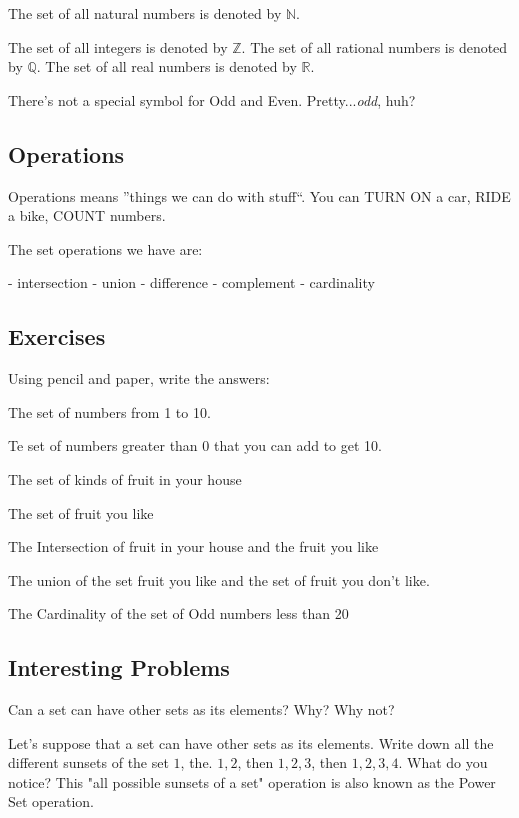 The set of all natural numbers is denoted by $\mathbb{N}$.

The set of all integers is denoted by
$\mathbb{Z}$.
The set of all rational numbers is denoted by $\mathbb{Q}$.
The set of all real numbers is denoted by $\mathbb{R}$.

There's not a special symbol for Odd and Even. Pretty...\textit{odd}, huh?

\subsection{Operations}

Operations means ''things we can do with stuff``.  You can TURN ON a car, RIDE a bike, COUNT numbers. 

The set operations we have are:

- intersection 
- union
- difference
- complement 
- cardinality 




\subsection{Exercises}

Using pencil and paper, write the answers:

The set of numbers from 1 to 10. 

Te set of numbers greater than 0 that you can add to get 10. 

The set of kinds of fruit in your house 

The set of fruit you like

The Intersection of fruit in your house and the fruit you like

The union of the set fruit you like and the set of fruit you don't like. 

The Cardinality of the set of Odd numbers less than 20

\subsection{Interesting Problems}

Can a set can have other sets as its elements? Why? Why not?

Let's suppose that a set can have other sets as its elements. Write down all the different sunsets of the set ${1}$, the. ${1,2}$, then ${1,2,3}$, then ${1,2,3,4}$. What do you notice? This "all possible sunsets of a set" operation is also known as the Power Set operation. 


